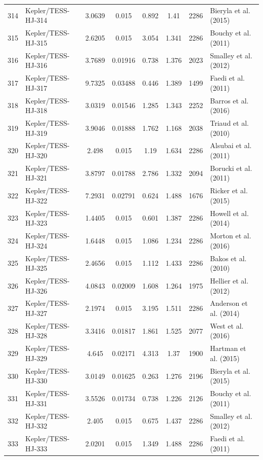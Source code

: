 \begin{longtable}{r l c c c c c p{4.2cm}}
314 & Kepler/TESS-HJ-314 & 3.0639 & 0.015 & 0.892 & 1.41 & 2286 & Bieryla et al. (2015) \\
315 & Kepler/TESS-HJ-315 & 2.6205 & 0.015 & 3.054 & 1.341 & 2286 & Bouchy et al. (2011) \\
316 & Kepler/TESS-HJ-316 & 3.7689 & 0.01916 & 0.738 & 1.376 & 2023 & Smalley et al. (2012) \\
317 & Kepler/TESS-HJ-317 & 9.7325 & 0.03488 & 0.446 & 1.389 & 1499 & Faedi et al. (2011) \\
318 & Kepler/TESS-HJ-318 & 3.0319 & 0.01546 & 1.285 & 1.343 & 2252 & Barros et al. (2016) \\
319 & Kepler/TESS-HJ-319 & 3.9046 & 0.01888 & 1.762 & 1.168 & 2038 & Triaud et al. (2010) \\
320 & Kepler/TESS-HJ-320 & 2.498 & 0.015 & 1.19 & 1.634 & 2286 & Alsubai et al. (2011) \\
321 & Kepler/TESS-HJ-321 & 3.8797 & 0.01788 & 2.786 & 1.332 & 2094 & Borucki et al. (2011) \\
322 & Kepler/TESS-HJ-322 & 7.2931 & 0.02791 & 0.624 & 1.488 & 1676 & Ricker et al. (2015) \\
323 & Kepler/TESS-HJ-323 & 1.4405 & 0.015 & 0.601 & 1.387 & 2286 & Howell et al. (2014) \\
324 & Kepler/TESS-HJ-324 & 1.6448 & 0.015 & 1.086 & 1.234 & 2286 & Morton et al. (2016) \\
325 & Kepler/TESS-HJ-325 & 2.4656 & 0.015 & 1.112 & 1.433 & 2286 & Bakos et al. (2010) \\
326 & Kepler/TESS-HJ-326 & 4.0843 & 0.02009 & 1.608 & 1.264 & 1975 & Hellier et al. (2012) \\
327 & Kepler/TESS-HJ-327 & 2.1974 & 0.015 & 3.195 & 1.511 & 2286 & Anderson et al. (2014) \\
328 & Kepler/TESS-HJ-328 & 3.3416 & 0.01817 & 1.861 & 1.525 & 2077 & West et al. (2016) \\
329 & Kepler/TESS-HJ-329 & 4.645 & 0.02171 & 4.313 & 1.37 & 1900 & Hartman et al. (2015) \\
330 & Kepler/TESS-HJ-330 & 3.0149 & 0.01625 & 0.263 & 1.276 & 2196 & Bieryla et al. (2015) \\
331 & Kepler/TESS-HJ-331 & 3.5526 & 0.01734 & 0.738 & 1.226 & 2126 & Bouchy et al. (2011) \\
332 & Kepler/TESS-HJ-332 & 2.405 & 0.015 & 0.675 & 1.437 & 2286 & Smalley et al. (2012) \\
333 & Kepler/TESS-HJ-333 & 2.0201 & 0.015 & 1.349 & 1.488 & 2286 & Faedi et al. (2011) \\

\end{longtable}
